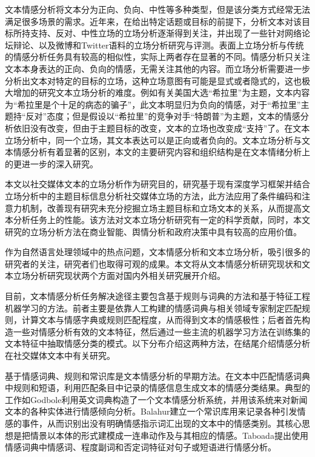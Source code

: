 文本情感分析将文本分为正向、负向、中性等多种类型，但是该分类方式经常无法满足很多场景的需求。近年来，在给出特定话题或目标的前提下，分析文本对该目标所持支持、反对、中性立场的立场分析逐渐得到关注，并出现了一些针对网络论坛辩论、以及微博和Twitter语料的立场分析研究与评测。表面上立场分析与传统的情感分析任务具有较高的相似性，实际上两者存在显著的不同。情感分析只关注文本本身表达的正向、负向的情感，无需关注其他的内容。而立场分析需要进一步分析出文本对特定的目标的立场，这种立场意图有可能是显式或者隐式的，这也极大增加的研究文本立场分析的难度。例如有关美国大选“希拉里”为主题，文本内容为“希拉里是个十足的病态的骗子”，此文本明显归为负向的情感，对于“希拉里”主题持“反对”态度；但是假设以“希拉里”的竞争对手“特朗普”为主题，文本的情感分析依旧没有改变，但由于主题目标的改变，文本的立场也改变成“支持”了。在文本立场分析中，同一个立场，其文本表达可以是正向或者负向的。文本立场分析与文本情感分析有着显著的区别，本文的主要研究内容和组织结构是在文本情绪分析上的更进一步的深入研究。

本文以社交媒体文本的立场分析作为研究目的，研究基于现有深度学习框架并结合立场分析中的主题目标信息分析社交媒体立场的方法，此方法应用了条件编码和注意力机制，改善现有研究未充分挖掘立场主题目标和立场文本的关系，从而提高文本分析任务上的性能。该方法对文本立场分析研究有一定的科学贡献，同时，本文研究的立场分析方法在商业智能、舆情分析和政府决策中具有较高的应用价值。



作为自然语言处理领域中的热点问题，文本情感分析和文本立场分析，吸引很多的研究者的关注，研究者们也取得可观的成果。本文将从文本情感分析研究现状和文本立场分析研究现状两个方面对国内外相关研究展开介绍。



目前，文本情感分析任务解决途径主要包含基于规则与词典的方法和基于特征工程机器学习的方法。前者主要是依靠人工构建的情感词典与相关领域专家制定匹配规则，计算文本与情感字典或规则匹配程度，从而得到文本的情感极性；后者首先构造一些对情感分析有效的文本特征，然后通过一些主流的机器学习方法在训练集的文本特征中抽取情感分类的模式。以下分布介绍这两种方法，在结尾介绍情感分析在社交媒体文本中有关研究。

基于情感词典、规则和常识库是文本情感分析的早期方法。在文本中匹配情感词典中规则和短语，利用匹配条目中记录的情感信息生成文本的情感分类结果。典型的工作如Godbole利用英文词典构造了一个文本情感分析系统，并用该系统来对新闻文本的各种实体进行情感倾向分析。Balahur建立一个常识库用来记录各种引发情感的事件，从而识别出没有明确情感指示词汇出现的文本中的情感类别。其核心思想是把情景以本体的形式建模成一连串动作及与其相应的情感。Taboada提出使用情感词典中情感词、程度副词和否定词特征对句子或短语进行情感分析。

